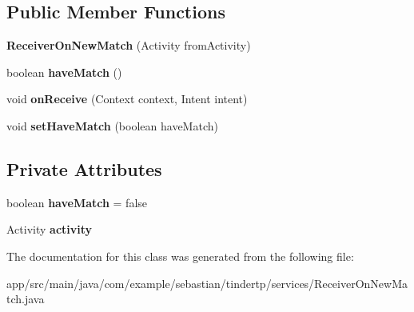 \subsection*{Public Member Functions}
\begin{DoxyCompactItemize}
\item 
{\bfseries Receiver\+On\+New\+Match} (Activity from\+Activity)\hypertarget{classcom_1_1example_1_1sebastian_1_1tindertp_1_1services_1_1ReceiverOnNewMatch_acf179981d5f282ec97363145d390558a}{}\label{classcom_1_1example_1_1sebastian_1_1tindertp_1_1services_1_1ReceiverOnNewMatch_acf179981d5f282ec97363145d390558a}

\item 
boolean {\bfseries have\+Match} ()\hypertarget{classcom_1_1example_1_1sebastian_1_1tindertp_1_1services_1_1ReceiverOnNewMatch_a943093d4e63569f06f0d179080c51c99}{}\label{classcom_1_1example_1_1sebastian_1_1tindertp_1_1services_1_1ReceiverOnNewMatch_a943093d4e63569f06f0d179080c51c99}

\item 
void {\bfseries on\+Receive} (Context context, Intent intent)\hypertarget{classcom_1_1example_1_1sebastian_1_1tindertp_1_1services_1_1ReceiverOnNewMatch_aa3f81e195751d8fcae9e4ba16390a3eb}{}\label{classcom_1_1example_1_1sebastian_1_1tindertp_1_1services_1_1ReceiverOnNewMatch_aa3f81e195751d8fcae9e4ba16390a3eb}

\item 
void {\bfseries set\+Have\+Match} (boolean have\+Match)\hypertarget{classcom_1_1example_1_1sebastian_1_1tindertp_1_1services_1_1ReceiverOnNewMatch_a553ebe4a6d9ccf4cd038f96a3c441111}{}\label{classcom_1_1example_1_1sebastian_1_1tindertp_1_1services_1_1ReceiverOnNewMatch_a553ebe4a6d9ccf4cd038f96a3c441111}

\end{DoxyCompactItemize}
\subsection*{Private Attributes}
\begin{DoxyCompactItemize}
\item 
boolean {\bfseries have\+Match} = false\hypertarget{classcom_1_1example_1_1sebastian_1_1tindertp_1_1services_1_1ReceiverOnNewMatch_a49f3594b20855f5aa4570133ef5897a7}{}\label{classcom_1_1example_1_1sebastian_1_1tindertp_1_1services_1_1ReceiverOnNewMatch_a49f3594b20855f5aa4570133ef5897a7}

\item 
Activity {\bfseries activity}\hypertarget{classcom_1_1example_1_1sebastian_1_1tindertp_1_1services_1_1ReceiverOnNewMatch_ae0432fa6e585cb2205c3ded5e3e68e6d}{}\label{classcom_1_1example_1_1sebastian_1_1tindertp_1_1services_1_1ReceiverOnNewMatch_ae0432fa6e585cb2205c3ded5e3e68e6d}

\end{DoxyCompactItemize}


The documentation for this class was generated from the following file\+:\begin{DoxyCompactItemize}
\item 
app/src/main/java/com/example/sebastian/tindertp/services/Receiver\+On\+New\+Match.\+java\end{DoxyCompactItemize}
